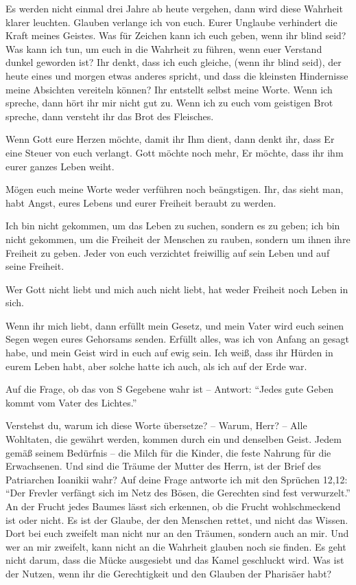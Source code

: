 Es werden nicht einmal drei Jahre ab heute vergehen, dann wird diese Wahrheit klarer leuchten. Glauben verlange ich von euch. Eurer Unglaube verhindert die Kraft meines Geistes. Was für Zeichen kann ich euch geben, wenn ihr blind seid? Was kann ich tun, um euch in die Wahrheit zu führen, wenn euer Verstand dunkel geworden ist? Ihr denkt, dass ich euch gleiche, (wenn ihr blind seid), der heute eines und morgen etwas anderes spricht, und dass die kleinsten Hindernisse meine Absichten vereiteln können? Ihr entstellt selbst meine Worte. Wenn ich spreche, dann hört ihr mir nicht gut zu. Wenn ich zu euch vom geistigen Brot spreche, dann versteht ihr das Brot des Fleisches. 

Wenn Gott eure Herzen möchte, damit ihr Ihm dient, dann denkt ihr, dass Er eine Steuer von euch verlangt. Gott möchte noch mehr, Er möchte, dass ihr ihm eurer ganzes Leben weiht. 

Mögen euch meine Worte weder verführen noch beängstigen. Ihr, das sieht man, habt Angst, eures Lebens und eurer Freiheit beraubt zu werden. 

Ich bin nicht gekommen, um das Leben zu suchen, sondern es zu geben; ich bin nicht gekommen, um die Freiheit der Menschen zu rauben, sondern um ihnen ihre Freiheit zu geben. Jeder von euch verzichtet freiwillig auf sein Leben und auf seine Freiheit.

Wer Gott nicht liebt und mich auch nicht liebt, hat weder Freiheit noch Leben in sich.

Wenn ihr mich liebt, dann erfüllt mein Gesetz, und mein Vater wird euch seinen Segen wegen eures Gehorsams senden. Erfüllt alles, was ich von Anfang an gesagt habe, und mein Geist wird in euch auf ewig sein. Ich weiß, dass ihr Hürden in eurem Leben habt, aber solche hatte ich auch, als ich auf der Erde war. 

Auf die Frage, ob das von S Gegebene wahr ist -- Antwort: "`Jedes gute Geben kommt vom Vater des Lichtes."' 

Verstehst du, warum ich diese Worte übersetze? -- Warum, Herr? -- Alle Wohltaten, die gewährt werden, kommen durch ein und denselben Geist. Jedem gemäß seinem Bedürfnis -- die Milch für die Kinder, die feste Nahrung für die Erwachsenen. Und sind die Träume der Mutter des Herrn, ist der Brief des Patriarchen Ioanikii wahr? Auf deine Frage antworte ich mit den Sprüchen 12,12: "`Der Frevler verfängt sich im Netz des Bösen, die Gerechten sind fest verwurzelt."' An der Frucht jedes Baumes lässt sich erkennen, ob die Frucht wohlschmeckend ist oder nicht. Es ist der Glaube, der den Menschen rettet, und nicht das Wissen. Dort bei euch zweifelt man nicht nur an den Träumen, sondern auch an mir. Und wer an mir zweifelt, kann nicht an die Wahrheit glauben noch sie finden. Es geht nicht darum, dass die Mücke ausgesiebt und das Kamel geschluckt wird. Was ist der Nutzen, wenn ihr die Gerechtigkeit und den Glauben der Pharisäer habt? 

